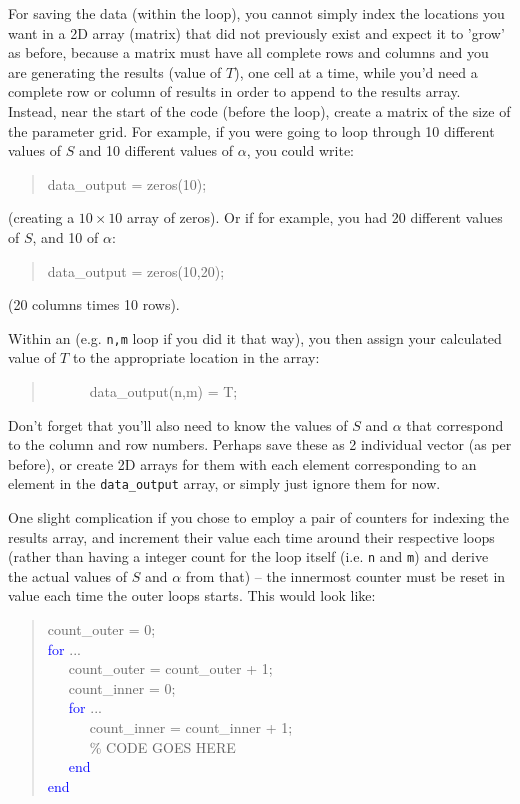 \documentclass{tufte-book} %
\newenvironment{docspec}{\begin{quotation}\ttfamily\parskip0pt\parindent0pt\ignorespaces}{\end{quotation}}
\begin{document}
For saving the data (within the loop), you cannot  simply index the locations you want in a 2D array (matrix) that did not previously exist and expect it to 'grow' as before, because a matrix must have all complete rows and columns and you are generating the results (value of \(T\)), one cell at a time, while you'd need a complete row or column of results in order to append to the results array. Instead, near the start of the code (before the loop), create a matrix of the size of the parameter grid. For example, if you were going to loop through 10 different values of \(S\) and 10 different values of \(\alpha\), you could write:
\begin{docspec}
data\_output = zeros(10);
\end{docspec}
(creating a \(10\times10\) array of zeros). Or if for example, you had 20 different  values of \(S\), and 10 of \(\alpha\):
\begin{docspec}
data\_output = zeros(10,20);
\end{docspec}
(20 columns times 10 rows).

Within an (e.g. \texttt{n,m} loop if you did it that way), you then assign your calculated value of \(T\) to the appropriate location in the array:
\begin{docspec}
\ \ \ \ \ \ data\_output(n,m) = T;
\end{docspec}
Don't forget that you'll also need to know the values of \(S\) and \(\alpha\) that correspond to the column and row numbers. Perhaps save these as 2 individual vector (as per before), or create 2D arrays for them with each element corresponding to an element in the \texttt{data\_output} array, or simply just ignore them for now.

One slight complication if you chose to employ a pair of counters for indexing the results array, and increment their value each time around their respective loops (rather than having a integer count for the loop itself (i.e. \texttt{n} and \texttt{m}) and derive the actual values of  \(S\) and \(\alpha\) from that) -- the innermost counter must be reset in value each time the outer loops starts. This would look like:

\begin{docspec}
count\_outer = 0;
\\\textcolor{blue}{for} ...
\\ \ \ \ count\_outer = count\_outer + 1;
\\ \ \ \ count\_inner = 0;
\\ \ \ \ \textcolor{blue}{for} ...
\\ \ \ \ \ \ \ count\_inner = count\_inner + 1;
\\ \ \ \ \ \ \ \textcolor[rgb]{0,0.501961,0}{\% CODE GOES HERE}
\\ \ \ \ \textcolor{blue}{end}
\\\textcolor{blue}{end}
\end{docspec}
\end{document}
